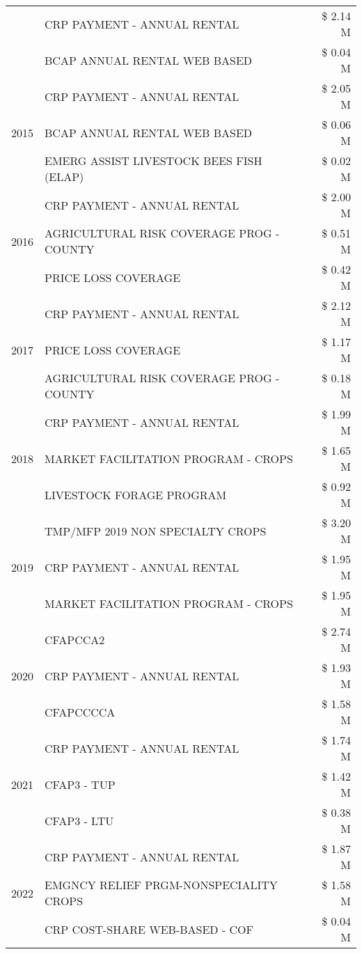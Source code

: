 \begin{tabular}{llr}
 & CRP PAYMENT - ANNUAL RENTAL & \$ 2.14 M \\
 & BCAP ANNUAL RENTAL WEB BASED & \$ 0.04 M \\
\cline{1-3}
\multirow[t]{3}{*}{2015} & CRP PAYMENT - ANNUAL RENTAL & \$ 2.05 M \\
 & BCAP ANNUAL RENTAL WEB BASED & \$ 0.06 M \\
 & EMERG ASSIST LIVESTOCK BEES FISH (ELAP) & \$ 0.02 M \\
\cline{1-3}
\multirow[t]{3}{*}{2016} & CRP PAYMENT - ANNUAL RENTAL & \$ 2.00 M \\
 & AGRICULTURAL RISK COVERAGE PROG - COUNTY & \$ 0.51 M \\
 & PRICE LOSS COVERAGE & \$ 0.42 M \\
\cline{1-3}
\multirow[t]{3}{*}{2017} & CRP PAYMENT - ANNUAL RENTAL & \$ 2.12 M \\
 & PRICE LOSS COVERAGE & \$ 1.17 M \\
 & AGRICULTURAL RISK COVERAGE PROG - COUNTY & \$ 0.18 M \\
\cline{1-3}
\multirow[t]{3}{*}{2018} & CRP PAYMENT - ANNUAL RENTAL & \$ 1.99 M \\
 & MARKET FACILITATION PROGRAM - CROPS & \$ 1.65 M \\
 & LIVESTOCK FORAGE PROGRAM & \$ 0.92 M \\
\cline{1-3}
\multirow[t]{3}{*}{2019} & TMP/MFP 2019 NON SPECIALTY CROPS & \$ 3.20 M \\
 & CRP PAYMENT - ANNUAL RENTAL & \$ 1.95 M \\
 & MARKET FACILITATION PROGRAM - CROPS & \$ 1.95 M \\
\cline{1-3}
\multirow[t]{3}{*}{2020} & CFAPCCA2 & \$ 2.74 M \\
 & CRP PAYMENT - ANNUAL RENTAL & \$ 1.93 M \\
 & CFAPCCCCA & \$ 1.58 M \\
\cline{1-3}
\multirow[t]{3}{*}{2021} & CRP PAYMENT - ANNUAL RENTAL & \$ 1.74 M \\
 & CFAP3 - TUP & \$ 1.42 M \\
 & CFAP3 - LTU & \$ 0.38 M \\
\cline{1-3}
\multirow[t]{3}{*}{2022} & CRP PAYMENT - ANNUAL RENTAL & \$ 1.87 M \\
 & EMGNCY RELIEF PRGM-NONSPECIALITY CROPS & \$ 1.58 M \\
 & CRP COST-SHARE WEB-BASED - COF & \$ 0.04 M \\
\cline{1-3}
\bottomrule
\end{tabular}
